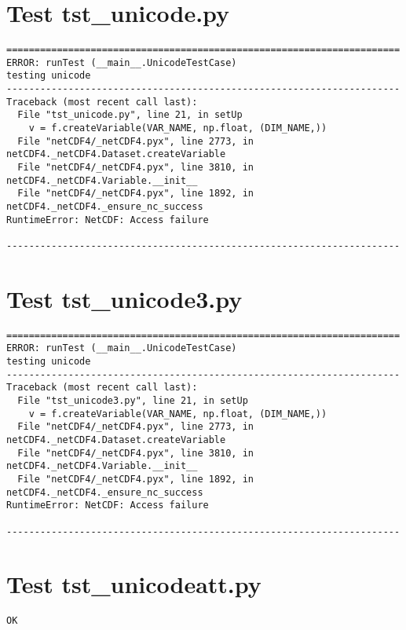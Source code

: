\section{Test tst\_unicode.py}

\begin{verbatim}
======================================================================
ERROR: runTest (__main__.UnicodeTestCase)
testing unicode
----------------------------------------------------------------------
Traceback (most recent call last):
  File "tst_unicode.py", line 21, in setUp
    v = f.createVariable(VAR_NAME, np.float, (DIM_NAME,))
  File "netCDF4/_netCDF4.pyx", line 2773, in netCDF4._netCDF4.Dataset.createVariable
  File "netCDF4/_netCDF4.pyx", line 3810, in netCDF4._netCDF4.Variable.__init__
  File "netCDF4/_netCDF4.pyx", line 1892, in netCDF4._netCDF4._ensure_nc_success
RuntimeError: NetCDF: Access failure

----------------------------------------------------------------------
\end{verbatim}

\section{Test tst\_unicode3.py}

\begin{verbatim}
======================================================================
ERROR: runTest (__main__.UnicodeTestCase)
testing unicode
----------------------------------------------------------------------
Traceback (most recent call last):
  File "tst_unicode3.py", line 21, in setUp
    v = f.createVariable(VAR_NAME, np.float, (DIM_NAME,))
  File "netCDF4/_netCDF4.pyx", line 2773, in netCDF4._netCDF4.Dataset.createVariable
  File "netCDF4/_netCDF4.pyx", line 3810, in netCDF4._netCDF4.Variable.__init__
  File "netCDF4/_netCDF4.pyx", line 1892, in netCDF4._netCDF4._ensure_nc_success
RuntimeError: NetCDF: Access failure

----------------------------------------------------------------------
\end{verbatim}

\section{Test tst\_unicodeatt.py}

\begin{verbatim}
OK
\end{verbatim}

